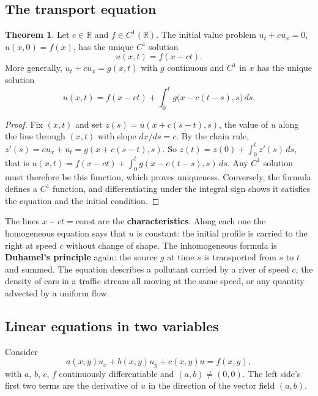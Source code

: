 \documentclass[11pt,a4paper]{article}
\numberwithin{equation}{section}
\theoremstyle{definition}
\newtheorem{thm}{Theorem}[subsection]
\begin{document}
\subsection{The transport equation}
\label{ssec:transport}

\begin{thm}
\label{thm:transport}
Let $c \in \mathbb R$ and $f \in C^1(\mathbb R)$. The initial value problem $u_t + cu_x = 0$, $u(x, 0) = f(x)$, has the unique $C^1$ solution
\[
u(x, t) = f(x - ct) .
\]
More generally, $u_t + cu_x = g(x, t)$ with $g$ continuous and $C^1$ in $x$ has the unique solution
\[
u(x, t) = f(x - ct) + \int_0^tg\bigl(x - c(t - s), s\bigr)\,ds .
\]
\end{thm}

\begin{proof}
Fix $(x, t)$ and set $z(s) = u(x + c(s - t), s)$, the value of $u$ along the line through $(x, t)$ with slope $dx/ds = c$. By the chain rule, $z'(s) = cu_x + u_t = g(x + c(s - t), s)$. So $z(t) = z(0) + \int_0^tz'(s)\,ds$,
that is $u(x, t) = f(x - ct) + \int_0^tg(x - c(t - s), s)\,ds$. Any $C^1$ solution must therefore be this function, which proves uniqueness. Conversely, the formula defines a $C^1$ function, and
differentiating under the integral sign shows it satisfies the equation and the initial condition.
\end{proof}

The lines $x - ct = \text{const}$ are the \textbf{characteristics}. Along each one the homogeneous equation says that $u$ is constant: the initial profile is carried to the right at speed $c$ without change
of shape. The inhomogeneous formula is \textbf{Duhamel's principle} again: the source $g$ at time $s$ is transported from $s$ to $t$ and summed. The equation describes a pollutant carried by a river of
speed $c$, the density of cars in a traffic stream all moving at the same speed, or any quantity advected by a uniform flow.

\subsection{Linear equations in two variables}
\label{ssec:linear2}

Consider
\begin{equation}
\label{eq:linear1st}
a(x, y)u_x + b(x, y)u_y + c(x, y)u = f(x, y) ,
\end{equation}
with $a$, $b$, $c$, $f$ continuously differentiable and $(a, b) \neq (0, 0)$. The left side's first two terms are the derivative of $u$ in the direction of the vector field $(a, b)$.
\end{document}
